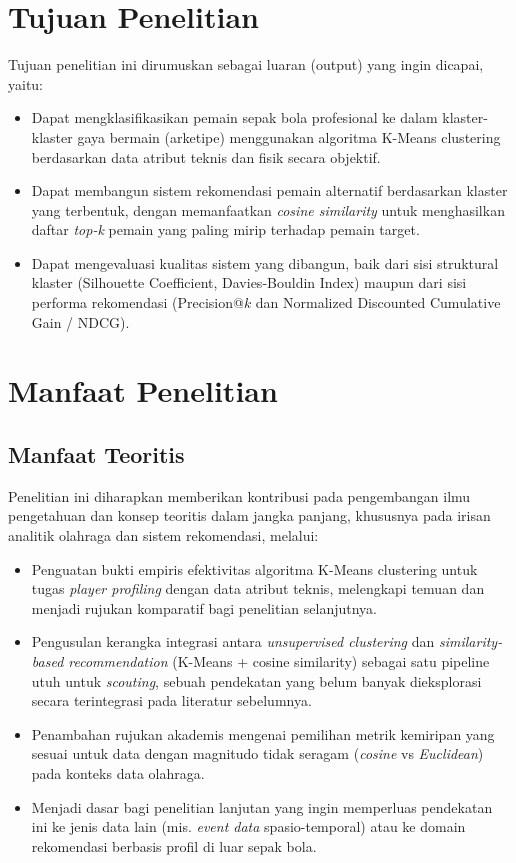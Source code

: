 \section{Tujuan Penelitian}
\label{sec:tujuan}

Tujuan penelitian ini dirumuskan sebagai luaran (output) yang ingin dicapai, yaitu:

\begin{itemize}
  \item Dapat mengklasifikasikan pemain sepak bola profesional ke dalam klaster-klaster gaya bermain (arketipe) menggunakan algoritma K-Means clustering berdasarkan data atribut teknis dan fisik secara objektif.
  \item Dapat membangun sistem rekomendasi pemain alternatif berdasarkan klaster yang terbentuk, dengan memanfaatkan \emph{cosine similarity} untuk menghasilkan daftar \emph{top-k} pemain yang paling mirip terhadap pemain target.
  \item Dapat mengevaluasi kualitas sistem yang dibangun, baik dari sisi struktural klaster (Silhouette Coefficient, Davies-Bouldin Index) maupun dari sisi performa rekomendasi (Precision@$k$ dan Normalized Discounted Cumulative Gain / NDCG).
\end{itemize}

\section{Manfaat Penelitian}
\label{sec:manfaat}

\subsection{Manfaat Teoritis}
\label{subsec:manfaat-teoritis}

Penelitian ini diharapkan memberikan kontribusi pada pengembangan ilmu pengetahuan dan konsep teoritis dalam jangka panjang, khususnya pada irisan analitik olahraga dan sistem rekomendasi, melalui:

\begin{itemize}
  \item Penguatan bukti empiris efektivitas algoritma K-Means clustering untuk tugas \emph{player profiling} dengan data atribut teknis, melengkapi temuan \textcite{akif2022} dan menjadi rujukan komparatif bagi penelitian selanjutnya.
  \item Pengusulan kerangka integrasi antara \emph{unsupervised clustering} dan \emph{similarity-based recommendation} (K-Means + cosine similarity) sebagai satu pipeline utuh untuk \emph{scouting}, sebuah pendekatan yang belum banyak dieksplorasi secara terintegrasi pada literatur sebelumnya.
  \item Penambahan rujukan akademis mengenai pemilihan metrik kemiripan yang sesuai untuk data dengan magnitudo tidak seragam (\emph{cosine} vs \emph{Euclidean}) pada konteks data olahraga.
  \item Menjadi dasar bagi penelitian lanjutan yang ingin memperluas pendekatan ini ke jenis data lain (mis. \emph{event data} spasio-temporal) atau ke domain rekomendasi berbasis profil di luar sepak bola.
\end{itemize}

